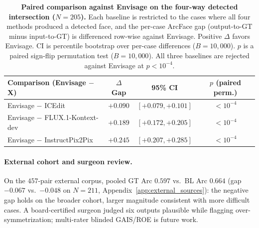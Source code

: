 \documentclass{article}
\newcommand{\method}{Envisage}
\begin{document}
\begin{table}[t]
\centering
\small
\caption{\textbf{Paired comparison against \method{} on the four-way detected
intersection ($N{=}205$).} Each baseline is restricted to the cases where all
four methods produced a detected face, and the per-case ArcFace gap (output-to-GT
minus input-to-GT) is differenced row-wise against \method{}. Positive $\Delta$
favors \method{}. CI is percentile bootstrap over per-case differences
($B{=}10{,}000$). $p$ is a paired sign-flip permutation test
($B{=}10{,}000$). All three baselines are rejected against \method{} at
$p < 10^{-4}$.}
\label{tab:paired_n205}
\begin{tabular}{@{}lccc@{}}
\toprule
\textbf{Comparison (\method{} $-$ X)} & \textbf{$\Delta$ Gap} & \textbf{95\% CI} & \textbf{$p$ (paired perm.)} \\
\midrule
\method{} $-$ ICEdit            & $+0.090$ & $[+0.079, +0.101]$ & $<10^{-4}$ \\
\method{} $-$ FLUX.1-Kontext-dev & $+0.189$ & $[+0.172, +0.205]$ & $<10^{-4}$ \\
\method{} $-$ InstructPix2Pix    & $+0.245$ & $[+0.207, +0.285]$ & $<10^{-4}$ \\
\bottomrule
\end{tabular}
\end{table}




\paragraph{External cohort and surgeon review.}\label{sec:surgeon-verification}
On the $457$-pair external corpus, pooled GT Arc $0.597$ vs.\ BL Arc
$0.664$ (gap $-0.067$ vs.\ $-0.048$ on $N{=}211$, Appendix~\ref{app:external_sources}):
the negative gap holds on the broader cohort, larger magnitude consistent
with more difficult cases. A board-certified surgeon judged six outputs
plausible while flagging over-symmetrization; multi-rater blinded GAIS/ROE
is future work.
\end{document}

